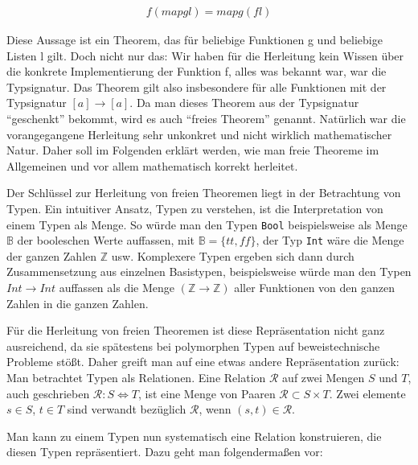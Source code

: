 \documentclass[11pt]{article} %
\begin{document}
\begin{align}
f (map g l) = map g (f l)
\end{align}

Diese Aussage ist ein Theorem, das für beliebige Funktionen g und beliebige Listen l gilt. Doch nicht nur das: Wir haben für
die Herleitung kein Wissen über die konkrete Implementierung der Funktion f, alles was bekannt war, war die Typsignatur.
Das Theorem gilt also insbesondere für alle Funktionen mit der Typsignatur $[a] \rightarrow [a]$. Da man dieses Theorem
aus der Typsignatur ``geschenkt'' bekommt, wird es auch ``freies Theorem'' genannt.
Natürlich war die vorangegangene Herleitung sehr unkonkret und nicht wirklich mathematischer Natur. Daher soll im Folgenden
erklärt werden, wie man freie Theoreme im Allgemeinen und vor allem mathematisch korrekt herleitet.

Der Schlüssel zur Herleitung von freien Theoremen liegt in der Betrachtung von Typen. Ein intuitiver Ansatz, Typen zu verstehen,
ist die Interpretation von einem Typen als Menge. So würde man den Typen \texttt{Bool} beispielsweise als Menge $\mathbb{B}$
der booleschen Werte auffassen, mit $\mathbb{B} = \{ tt, ff \}$, der Typ \texttt{Int} wäre die Menge der ganzen Zahlen
$\mathbb{Z}$ usw. Komplexere Typen ergeben sich dann durch Zusammensetzung aus einzelnen Basistypen, beispielsweise
würde man den Typen \texttt{$Int \rightarrow Int$} auffassen als die Menge $(\mathbb{Z} \rightarrow \mathbb{Z})$ aller Funktionen von den ganzen Zahlen in die ganzen Zahlen.

Für die Herleitung von freien Theoremen ist diese Repräsentation nicht ganz ausreichend, da sie spätestens bei polymorphen
Typen auf beweistechnische Probleme stößt. Daher greift man auf eine etwas andere Repräsentation zurück: Man betrachtet
Typen als Relationen. Eine Relation $\mathcal{R}$ auf zwei Mengen $S$ und $T$, auch geschrieben $\mathcal{R} : S \Leftrightarrow T$, ist eine Menge von Paaren $\mathcal{R} \subset S \times T$. Zwei elemente $s \in S$, $t \in T$ sind verwandt bezüglich
$\mathcal{R}$, wenn $(s, t) \in \mathcal{R}$.

Man kann zu einem Typen nun systematisch eine Relation konstruieren, die diesen Typen repräsentiert. Dazu geht man
folgendermaßen vor:
\end{document}
